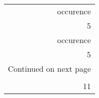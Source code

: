 \begin{longtable}{r}
\toprule
 occurence \\
         5 \\
\midrule
\endfirsthead

\toprule
 occurence \\
         5 \\
\midrule
\endhead
\midrule
\multicolumn{1}{r}{{Continued on next page}} \\
\midrule
\endfoot

\bottomrule
\endlastfoot
         1 \\
        11 \\
\end{longtable}
